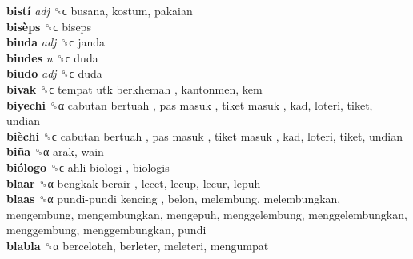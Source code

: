 \textbf{bistí} \emph{adj}  ␝ϲ  busana, kostum, pakaian  \\
\textbf{bisèps} ␝ϲ  biseps  \\
\textbf{biuda} \emph{adj}  ␝ϲ  janda  \\
\textbf{biudes} \emph{n}  ␝ϲ  duda  \\
\textbf{biudo} \emph{adj}  ␝ϲ  duda  \\
\textbf{bivak} ␝ϲ   tempat utk berkhemah , kantonmen, kem  \\
\textbf{biyechi} ␝α   cabutan bertuah ,  pas masuk ,  tiket masuk , kad, loteri, tiket, undian  \\
\textbf{bièchi} ␝ϲ   cabutan bertuah ,  pas masuk ,  tiket masuk , kad, loteri, tiket, undian  \\
\textbf{biña} ␝α  arak, wain  \\
\textbf{biólogo} ␝ϲ   ahli biologi , biologis  \\
\textbf{blaar} ␝α   bengkak berair , lecet, lecup, lecur, lepuh  \\
\textbf{blaas} ␝α   pundi-pundi kencing , belon, melembung, melembungkan, mengembung, mengembungkan, mengepuh, menggelembung, menggelembungkan, menggembung, menggembungkan, pundi  \\
\textbf{blabla} ␝α  berceloteh, berleter, meleteri, mengumpat  \\
